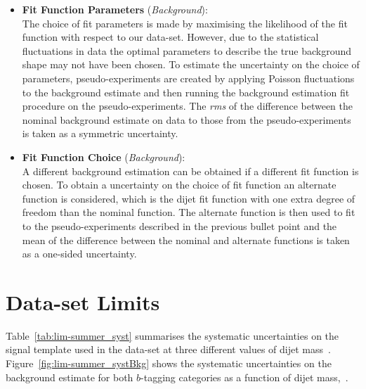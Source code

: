 \begin{itemize}[leftmargin=*]
\item \textbf{Fit Function Parameters} \hspace{1mm} (\textit{Background}):\\
  The choice of fit parameters is made by maximising the likelihood of the fit function with respect to our data-set.
  However, due to the statistical fluctuations in data the optimal parameters to describe
  the true background shape may not have been chosen.
  To estimate the uncertainty on the choice of parameters, pseudo-experiments are created by applying Poisson
  fluctuations to the background estimate and then running the background estimation fit procedure on the pseudo-experiments.
  The \textit{rms} of the difference between the nominal background estimate on data to those from the pseudo-experiments is
  taken as a symmetric uncertainty. \vspace{0.5em}
\item\textbf{Fit Function Choice}  \hspace{1mm} (\textit{Background}):\\
  A different background estimation can be obtained if a different fit function is chosen.
  To obtain a uncertainty on the choice of fit function an alternate function is considered,
  which is the dijet fit function with one extra degree of freedom than the nominal function.
  The alternate function is then used to fit to the pseudo-experiments described in the previous bullet point
  and the mean of the difference between the nominal and alternate functions is taken as a one-sided uncertainty.
  \vspace{0.5em}
\end{itemize}

\section{\summer{} Data-set Limits}
\label{sec:lim-summer}

Table~\ref{tab:lim-summer_syst} summarises the systematic uncertainties
on the signal template used in the \summer{} data-set at
three different values of dijet mass~\mjj.
Figure~\ref{fig:lim-summer_systBkg} shows the systematic uncertainties on the background estimate
for both $b$-tagging categories as a function of dijet mass,~\mjj.

